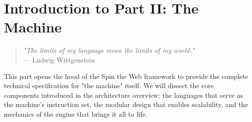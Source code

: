 
\chapter*{Introduction to Part II: The Machine}
\label{part:framework-mechanics}

\begin{quote}
\textit{"The limits of my language mean the limits of my world."} \\
— Ludwig Wittgenstein
\end{quote}

This part opens the hood of the Spin the Web framework to provide the complete technical specification for "the machine" itself. We will dissect the core components introduced in the architecture overview: the languages that serve as the machine's instruction set, the modular design that enables scalability, and the mechanics of the engine that brings it all to life.

